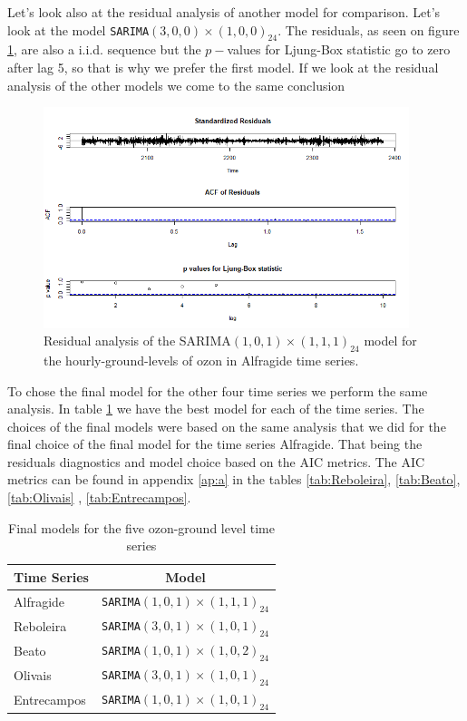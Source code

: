 \documentclass{article}
\begin{document}
Let's look also at the residual analysis of another model for comparison. Let's look at 
the model   \verb|SARIMA|$(3,0,0) \times (1,0,0)_{24}$. The residuals, as seen on 
figure \ref{fig:res_o2}, are also a i.i.d. sequence  but the $p-$values for 
Ljung-Box statistic go to zero after lag 5, so that is why we prefer the first model.
If we look at the residual analysis of the other models we come to the same conclusion

\begin{figure}[ht!]
    \centering
    \includegraphics[width=0.95\textwidth]{Plots1/ra_2.png}
    \caption{Residual analysis of the SARIMA$(1,0,1) \times (1,1,1)_{24}$
    model for the hourly-ground-levels of ozon in Alfragide time series.}
    \label{fig:res_o2}
\end{figure}


To chose the final model for the other four time series we 
perform the same analysis. In table \ref{tab:final_ozon} we have the best 
model for each of the time series. The choices of the final models were 
based on the same analysis that we did for the final choice of the final model 
for the time series Alfragide. That being the residuals diagnostics and 
model choice based on the AIC metrics. The AIC metrics can 
be found in appendix \ref{ap:a} in the tables \ref{tab:Reboleira},
\ref{tab:Beato}, \ref{tab:Olivais} , \ref{tab:Entrecampos}.


\begin{table}
    \centering
    \begin{tabular}{|l|c|}
        \hline
        Time Series & Model \\
        \hline
        Alfragide & \verb|SARIMA|$(1,0,1) \times (1,1,1)_{24}$ \\
        \hline
        Reboleira & \verb|SARIMA|$(3,0,1) \times (1,0,1)_{24}$  \\
        \hline
        Beato &   \verb|SARIMA|$(1,0,1) \times (1,0,2)_{24}$ \\
        \hline
        Olivais &  \verb|SARIMA|$(3,0,1) \times (1,0,1)_{24}$  \\
        \hline
        Entrecampos &  \verb|SARIMA|$(1,0,1) \times (1,0,1)_{24}$ \\
        \hline
    \end{tabular}
    \caption{Final models for the five ozon-ground level time series}
    \label{tab:final_ozon}
\end{table}
    
\end{document}
